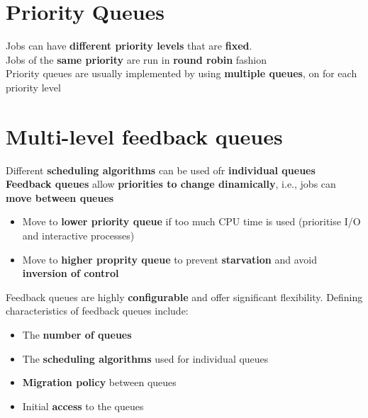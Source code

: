 \documentclass{article}
\begin{document}
\section{Priority Queues}
\begin{flushleft}
Jobs can have \textbf{different priority levels} that are \textbf{fixed}.\\
Jobs of the \textbf{same priority} are run in \textbf{round robin} fashion\\
Priority queues are usually implemented by using \textbf{multiple queues}, on for each priority level
\end{flushleft}

\section{Multi-level feedback queues}
\begin{flushleft}
Different \textbf{scheduling algorithms} can be used ofr \textbf{individual queues}\\
\textbf{Feedback queues} allow \textbf{priorities to change dinamically}, i.e., jobs can \textbf{move between queues}
\begin{itemize}
	\item Move to \textbf{lower priority queue} if too much CPU time is used (prioritise I/O and interactive processes)
	\item Move to \textbf{higher proprity queue} to prevent \textbf{starvation} and avoid \textbf{inversion of control}
\end{itemize}
\smallskip

Feedback queues are highly \textbf{configurable} and offer significant flexibility. Defining characteristics of feedback queues include:
\begin{itemize}
	\item The \textbf{number of queues}
	\item The \textbf{scheduling algorithms} used for individual queues
	\item \textbf{Migration policy} between queues
	\item Initial \textbf{access} to the queues
\end{itemize}
\end{flushleft}
\end{document}
